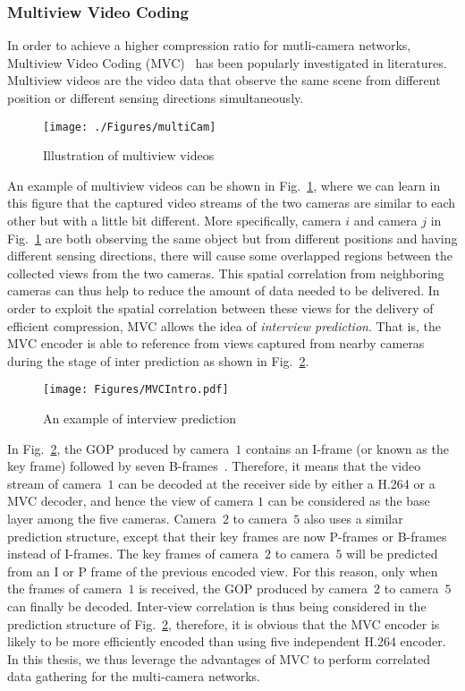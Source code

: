\subsubsection{Multiview Video Coding}
\label{sec::MultiviewIntro}
%
In order to achieve a higher compression ratio for mutli-camera networks, Multiview Video Coding (MVC)~\cite{MVCoverview} has been popularly investigated in literatures.
Multiview videos are the video data that observe the same scene from different position or different sensing directions simultaneously.
%
\begin{figure}
\begin{center}
\texttt{[image: ./Figures/multiCam]}
\caption{\label{fig::multiCam}Illustration of multiview videos}
\end{center}
\end{figure}
%
An example of multiview videos can be shown in Fig.~\ref{fig::multiCam}, where we can learn in this figure that the captured video streams of the two cameras are similar to each other but with a little bit different.
More specifically, camera $i$ and camera $j$ in Fig.~\ref{fig::multiCam} are both observing the same object but from different positions and having different sensing directions, there will cause some overlapped regions between the collected views from the two cameras.
This spatial correlation from neighboring cameras can thus help to reduce the amount of data needed to be delivered.
In order to exploit the spatial correlation between these views for the delivery of efficient compression, MVC allows the idea of \emph{interview prediction}.
That is, the MVC encoder is able to reference from views captured from nearby cameras during the stage of inter prediction as shown in Fig.~\ref{fig::MVC}.
%
\begin{figure}
\centering
\texttt{[image: Figures/MVCIntro.pdf]}
\caption{An example of interview prediction\label{fig::MVC}}
\end{figure}
%

In Fig.~\ref{fig::MVC}, the GOP produced by camera~$1$ contains an I-frame (or known as the key frame) followed by seven B-frames~\cite{HierarchicalBs}.
Therefore, it means that the video stream of camera~$1$ can be decoded at the receiver side by either a H.264 or a MVC decoder, and hence the view of camera $1$ can be considered as the base layer among the five cameras.
Camera~$2$ to camera~$5$ also uses a similar prediction structure, except that their key frames are now P-frames or B-frames instead of I-frames.
The key frames of camera~$2$ to camera~$5$ will be predicted from an I or P frame of the previous encoded view.
For this reason, only when the frames of camera~$1$ is received, the GOP produced by camera~$2$ to camera~$5$ can finally be decoded.
Inter-view correlation is thus being considered in the prediction structure of Fig.~\ref{fig::MVC}, therefore, it is obvious that the MVC encoder is likely to be more efficiently encoded than using five independent H.264 encoder.
In this thesis, we thus leverage the advantages of MVC to perform correlated data gathering for the multi-camera networks.